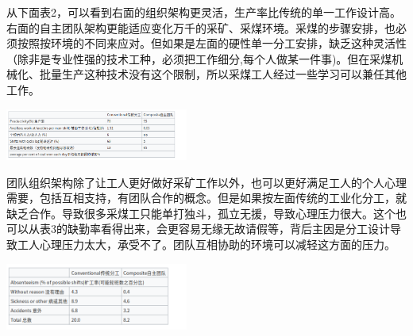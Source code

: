 从下面表2，可以看到右面的组织架构更灵活，生产率比传统的单一工作设计高。右面的自主团队架构更能适应变化万千的采矿、采煤环境。采煤的步骤安排，也必须按照按环境的不同来应对。但如果是左面的硬性单一分工安排，缺乏这种灵活性（除非是专业性强的技术工种，必须把工作细分,每个人做某一件事)。但在采煤机械化、批量生产这种技术没有这个限制，所以采煤工人经过一些学习可以兼任其他工作。

\includegraphics[width=6cm]{Screenshotfrom2023-11-0303-25-45.png}

团队组织架构除了让工人更好做好采矿工作以外，也可以更好满足工人的个人心理需要，包括互相支持，有团队合作的概念。但是如果按左面传统的工业化分工，就缺乏合作。导致很多采煤工只能单打独斗，孤立无援，导致心理压力很大。这个也可以从表3的缺勤率看得出来，会更容易无缘无故请假等，背后主因是分工设计导致工人心理压力太大，承受不了。团队互相协助的环境可以减轻这方面的压力。

\includegraphics[width=6cm]{Screenshotfrom2023-11-0303-26-09.png}




